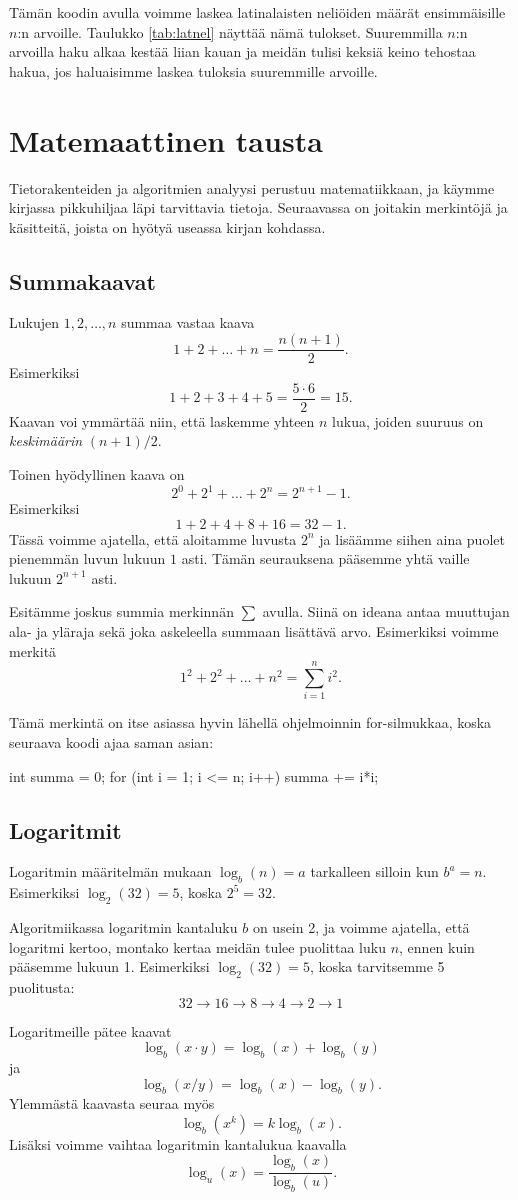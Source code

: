 Tämän koodin avulla voimme laskea latinalaisten neliöiden
määrät ensimmäisille $n$:n arvoille.
Taulukko \ref{tab:latnel} näyttää nämä tulokset.
Suuremmilla $n$:n arvoilla haku alkaa kestää liian kauan
ja meidän tulisi keksiä keino tehostaa hakua,
jos haluaisimme laskea tuloksia suuremmille arvoille.

\section{Matemaattinen tausta}

Tietorakenteiden ja algoritmien analyysi perustuu matematiikkaan,
ja käym\-me kirjassa pikkuhiljaa läpi tarvittavia tietoja.
Seuraavassa on joitakin merkintöjä ja käsitteitä, joista on hyötyä
useassa kirjan kohdassa.

\subsection{Summakaavat}

Lukujen $1,2,\dots,n$ summaa vastaa kaava
\[1+2+\dots+n = \frac{n(n+1)}{2}.\]
Esimerkiksi
\[1+2+3+4+5 = \frac{5 \cdot 6}{2}=15.\]
Kaavan voi ymmärtää niin, että laskemme yhteen $n$ lukua,
joiden suuruus on \emph{keskimäärin} $(n+1)/2$.

Toinen hyödyllinen kaava on
\[2^0+2^1+\dots+2^n = 2^{n+1}-1.\]
Esimerkiksi
\[1+2+4+8+16=32-1.\]
Tässä voimme ajatella, että aloitamme luvusta $2^n$
ja lisäämme siihen aina puolet pienemmän luvun lukuun $1$ asti.
Tämän seurauksena pääsemme yhtä vaille lukuun $2^{n+1}$ asti.

Esitämme joskus summia merkinnän $\sum$ avulla.
Siinä on ideana antaa muuttujan ala- ja yläraja sekä
joka askeleella summaan lisättävä arvo.
Esimerkiksi voimme merkitä
\[1^2 + 2^2 + \dots + n^2 = \sum_{i=1}^n i^2.\]

Tämä merkintä on itse asiassa hyvin lähellä ohjelmoinnin
for-silmukkaa, koska seuraava koodi ajaa saman asian:

\begin{code}
int summa = 0;
for (int i = 1; i <= n; i++) {
    summa += i*i;
}
\end{code}

\subsection{Logaritmit}

Logaritmin määritelmän mukaan $\log_b(n)=a$
tarkalleen silloin kun $b^a=n$.
Esimerkiksi $\log_2(32)=5$, koska $2^5=32$.

Algoritmiikassa logaritmin kantaluku $b$ on usein 2,
ja voimme ajatella, että logaritmi kertoo, montako kertaa
meidän tulee puolittaa luku $n$, ennen kuin pääsemme lukuun 1.
Esimerkiksi $\log_2(32)=5$, koska tarvitsemme 5 puolitusta:
\[32 \rightarrow 16 \rightarrow 8 \rightarrow 4 \rightarrow 2 \rightarrow 1\]

Logaritmeille pätee kaavat
\[\log_b(x \cdot y) = \log_b(x)+\log_b(y)\]
ja
\[\log_b(x / y) = \log_b(x)-\log_b(y).\]
Ylemmästä kaavasta seuraa myös
\[\log_b(x^k) = k \log_b(x).\]
Lisäksi voimme vaihtaa logaritmin kantalukua kaavalla
\[\log_u(x) = \frac{\log_b(x)}{\log_b(u)}.\]